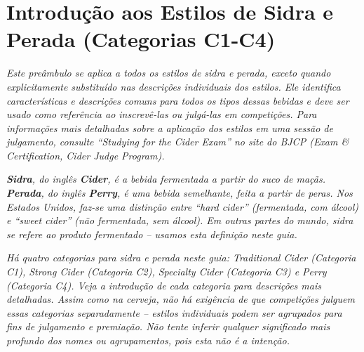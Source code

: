 \section*{Introdução aos Estilos de Sidra e Perada (Categorias C1-C4)}
\textit{Este preâmbulo se aplica a todos os estilos de sidra e perada, exceto quando explicitamente substituído nas descrições individuais dos estilos. Ele identifica características e descrições comuns para todos os tipos dessas bebidas e deve ser usado como referência ao inscrevê-las ou julgá-las em competições. Para informações mais detalhadas sobre a aplicação dos estilos em uma sessão de julgamento, consulte “Studying for the Cider Exam” no site do BJCP (Exam & Certification, Cider Judge Program).}

\textit{\textbf{Sidra}, do inglês \textbf{Cider}, é a bebida fermentada a partir do suco de maçãs. \textbf{Perada}, do inglês \textbf{Perry}, é uma bebida semelhante, feita a partir de peras. Nos Estados Unidos, faz-se uma distinção entre “hard cider”  (fermentada, com álcool) e “sweet cider”  (não fermentada, sem álcool). Em outras partes do mundo, sidra se refere ao produto fermentado – usamos esta definição neste guia.} 

\textit{Há quatro categorias para sidra e perada neste guia: Traditional Cider (Categoria C1), Strong Cider (Categoria C2), Specialty Cider (Categoria C3) e Perry (Categoria C4). Veja a introdução de cada categoria para descrições mais detalhadas. Assim como na cerveja, não há exigência de que competições julguem essas categorias separadamente – estilos individuais podem ser agrupados para fins de julgamento e premiação. Não tente inferir qualquer significado mais profundo dos nomes ou agrupamentos, pois esta não é a intenção.}
